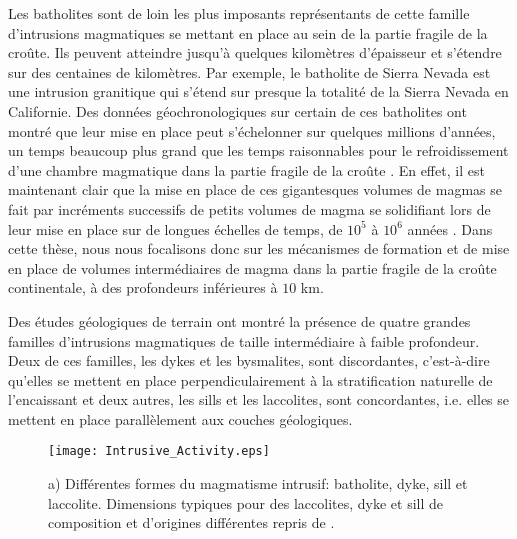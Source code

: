 Les batholites sont de loin  les plus imposants représentants de cette
famille d'intrusions  magmatiques se  mettant en place  au sein  de la
partie fragile de  la croûte.  Ils peuvent  atteindre jusqu'à quelques
kilomètres d'épaisseur  et s'étendre sur des  centaines de kilomètres.
Par  exemple,  le  batholite  de   Sierra  Nevada  est  une  intrusion
granitique qui s'étend sur presque la  totalité de la Sierra Nevada en
Californie.   Des   données  géochronologiques  sur  certain   de  ces
batholites ont  montré que  leur mise en  place peut  s'échelonner sur
quelques millions d'années, un temps beaucoup plus grand que les temps
raisonnables pour le refroidissement  d'une chambre magmatique dans la
partie fragile de  la croûte \citep{Glazner:2004gv}. En  effet, il est
maintenant clair que  la mise en place de ces  gigantesques volumes de
magmas se fait par incréments successifs de petits volumes de magma se
solidifiant lors  de leur  mise en  place sur  de longues  échelles de
temps,         de        $10^5$         à        $10^6$         années
\citep{Petford:2000cc,Glazner:2004gv}.   Dans cette  thèse, nous  nous
focalisons donc sur les mécanismes de formation et de mise en place de
volumes intermédiaires  de magma dans  la partie fragile de  la croûte
continentale, à des profondeurs inférieures à $10$ km.

Des études  géologiques de  terrain ont montré  la présence  de quatre
grandes familles  d'intrusions magmatiques  de taille  intermédiaire à
faible profondeur.  Deux de ces familles, les dykes et les bysmalites,
sont  discordantes,   c'est-à-dire  qu'elles   se  mettent   en  place
perpendiculairement à  la stratification naturelle de  l'encaissant et
deux  autres,   les  sills  et  les   laccolites,  sont  concordantes,
i.e. elles se mettent en place parallèlement aux couches géologiques.

\begin{figure}[htpb]
  \begin{center}
    \graphicspath{ {/Users/thorey/Documents/These/Manuscript/Figure/Chapter1/} }
    \texttt{[image: Intrusive\_Activity.eps]}
    \caption{a) Différentes formes  du magmatisme intrusif: batholite,
      dyke,  sill   et  laccolite.    Dimensions  typiques   pour  des
      laccolites,   dyke  et   sill  de   composition  et   d'origines
      différentes repris de \citet{Cruden:tg}. }
    \label{C1-Dimension}
  \end{center}
\end{figure}

